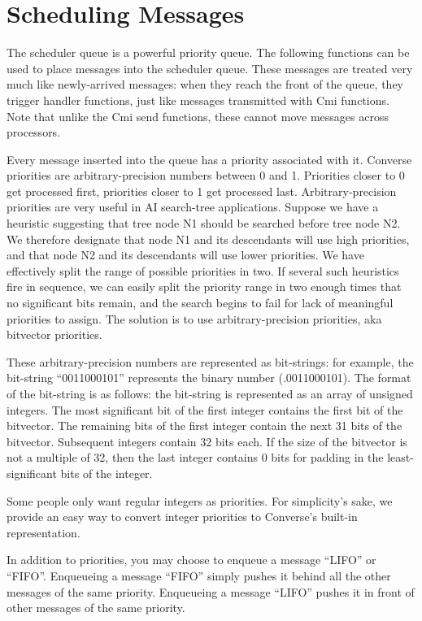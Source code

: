 \section{Scheduling Messages}
\label{schedqueue}

The scheduler queue is a powerful priority queue.  The following
functions can be used to place messages into the scheduler queue.
These messages are treated very much like newly-arrived messages: when
they reach the front of the queue, they trigger handler functions,
just like messages transmitted with Cmi functions.  Note that unlike
the Cmi send functions, these cannot move messages across processors.

Every message inserted into the queue has a priority associated with
it.  Converse priorities are arbitrary-precision numbers between 0 and
1.  Priorities closer to 0 get processed first, priorities closer to 1
get processed last.  Arbitrary-precision priorities are very useful in
AI search-tree applications. Suppose we have a heuristic suggesting
that tree node N1 should be searched before tree node N2. We therefore
designate that node N1 and its descendants will use high priorities,
and that node N2 and its descendants will use lower priorities. We
have effectively split the range of possible priorities in two. If
several such heuristics fire in sequence, we can easily split the
priority range in two enough times that no significant bits remain,
and the search begins to fail for lack of meaningful priorities to
assign. The solution is to use arbitrary-precision priorities, aka
bitvector priorities.

These arbitrary-precision numbers are represented as bit-strings: for
example, the bit-string ``0011000101'' represents the binary number
(.0011000101).  The format of the bit-string is as follows: the
bit-string is represented as an array of unsigned integers. The most
significant bit of the first integer contains the first bit of the
bitvector.  The remaining bits of the first integer contain the next
31 bits of the bitvector.  Subsequent integers contain 32 bits
each. If the size of the bitvector is not a multiple of 32, then the
last integer contains 0 bits for padding in the least-significant bits
of the integer.

Some people only want regular integers as priorities.  For
simplicity's sake, we provide an easy way to convert integer
priorities to Converse's built-in representation.

In addition to priorities, you may choose to enqueue a message
``LIFO'' or ``FIFO''.  Enqueueing a message ``FIFO'' simply pushes it
behind all the other messages of the same priority.  Enqueueing a
message ``LIFO'' pushes it in front of other messages of the same
priority.

